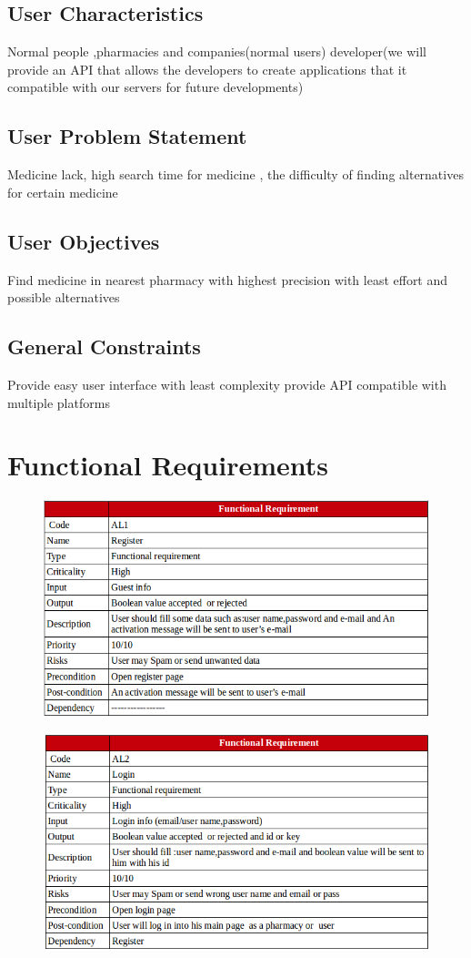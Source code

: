 \documentclass[]{article}
\begin{document}
\subsection{ User Characteristics}
Normal people ,pharmacies and companies(normal users) developer(we will provide an API that allows the developers to create applications that it compatible with our servers for future developments)
\subsection{ User Problem Statement}
Medicine lack, high search time for medicine , the difficulty of finding alternatives for certain medicine
\subsection{ User Objectives}
Find medicine in nearest pharmacy with highest precision with least effort and possible alternatives 
\subsection{ General Constraints}
Provide easy user interface with least complexity 
provide API compatible with multiple platforms


\section{Functional Requirements}

\begin{figure}[H]
\centering
\includegraphics[scale=0.4]{./f/01}
\end{figure}

\begin{figure}[H]
\centering
\includegraphics[scale=0.4]{./f/02}
\end{figure}
\end{document}
